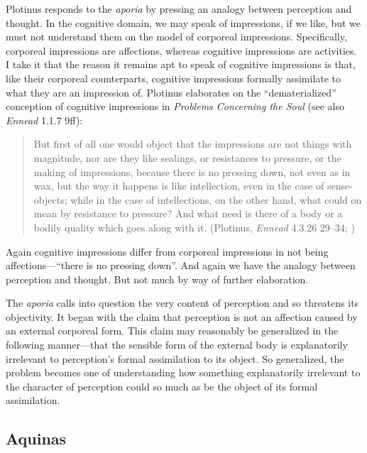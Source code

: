 \documentclass[12pt]{article}
\begin{document}
Plotinus responds to the \emph{aporia} by pressing an analogy between perception and thought. In the cognitive domain, we may speak of impressions, if we like, but we must not understand them on the model of corporeal impressions. Specifically, corporeal impressions are affections, whereas cognitive impressions are activities. I take it that the reason it remains apt to speak of cognitive impressions is that, like their corporeal counterparts, cognitive impressions formally assimilate to what they are an impression of. Plotinus elaborates on the ``dematerialized'' conception of cognitive impressions in \emph{Problems Concerning the Soul} (see also \emph{Ennead} 1.1.7 9ff):
\begin{quote}
	But first of all one would object that the impressions are not things with magnitude, nor are they like sealings, or resistances to pressure, or the making of impressions, because there is no pressing down, not even as in wax, but the way it happens is like intellection, even in the case of sense-objects; while in the case of intellections, on the other hand, what could on mean by resistance to pressure? And what need is there of a body or a bodily quality which goes along with it. (Plotinus, \emph{Ennead} 4.3.26 29--34; \citealt[101]{Dillon:2015yf})
\end{quote}
Again cognitive impressions differ from corporeal impressions in not being affec\-tions---``there is no pressing down''. And again we have the analogy between perception and thought. But not much by way of further elaboration.

The \emph{aporia} calls into question the very content of perception and so threatens its objectivity. It began with the claim that perception is not an affection caused by an external corporeal form. This claim may reasonably be generalized in the following manner---that the sensible form of the external body is explanatorily irrelevant to perception's formal assimilation to its object. So generalized, the problem becomes one of understanding how something explanatorily irrelevant to the character of perception could so much as be the object of its formal assimilation.


\subsection{Aquinas} %
\label{sub:aquinas}
\end{document}
